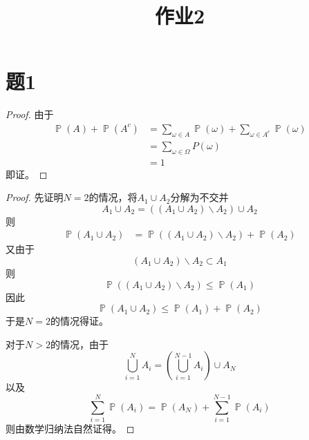 \documentclass[cn]{homework}
\title{作业2}
\DeclareMathOperator{\prob}{\mathbb P}
\begin{document}
    \maketitle

    \section{题1}
    \begin{subproblem}
        \item
        \begin{proof}
            由于
            \begin{align*}
                \prob(A)+\prob(A^c)&=
                \sum_{\omega\in A}\prob(\omega)+\sum_{\omega\in A^c}\prob(\omega)\\
                &=\sum_{\omega\in\Omega}P(\omega)\\
                &=1
            \end{align*}
            即证。
        \end{proof}

        \item
        \begin{proof}
            先证明$N=2$的情况，将$A_1\cup A_2$分解为不交并
            \[A_1\cup A_2=((A_1\cup A_2)\backslash A_2)\cup A_2\]
            则
            \begin{align*}
                \prob(A_1\cup A_2)&=\prob((A_1\cup A_2)\backslash A_2)
                +\prob(A_2)
            \end{align*}
            又由于
            \[(A_1\cup A_2)\backslash A_2\subset A_1\]
            则
            \[\prob((A_1\cup A_2)\backslash A_2)\leq\prob(A_1)\]
            因此
            \[\prob(A_1\cup A_2)\leq\prob(A_1)+\prob(A_2)\]
            于是$N=2$的情况得证。

            对于$N>2$的情况，由于
            \[\bigcup_{i=1}^NA_i=\left(\bigcup_{i=1}^{N-1}A_i\right)\cup A_N\]
            以及
            \[\sum_{i=1}^N\prob(A_i)=\prob(A_N)+\sum_{i=1}^{N-1}\prob(A_i)\]
            则由数学归纳法自然证得。
        \end{proof}
    \end{subproblem}
\end{document}
